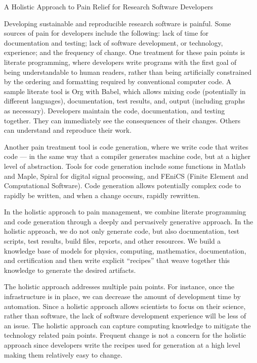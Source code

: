 A Holistic Approach to Pain Relief for Research Software Developers

Developing sustainable and reproducible research software is painful. Some
sources of pain for developers include the following: lack of time for
documentation and testing; lack of software development, or technology,
experience; and the frequency of change.  One treatment for these pain points is
literate programming, where developers write programs with the first goal of
being understandable to human readers, rather than being artificially
constrained by the ordering and formatting required by conventional computer
code.  A sample literate tool is Org with Babel, which allows mixing code
(potentially in different languages), documentation, test results, and, output
(including graphs as necessary).  Developers maintain the code, documentation,
and testing together. They can immediately see the consequences of their
changes.  Others can understand and reproduce their work.

Another pain treatment tool is code generation, where we write code that writes
code --- in the same way that a compiler generates machine code, but at a higher
level of abstraction. Tools for code generation include some functions in Matlab
and Maple, Spiral for digital signal processing, and FEniCS (Finite Element and
Computational Software).  Code generation allows potentially complex code to
rapidly be written, and when a change occurs, rapidly rewritten.  

In the holistic approach to pain management, we combine literate programming and
code generation through a deeply and pervasively generative approach.  In the
holistic approach, we do not only generate code, but also documentation, test
scripts, test results, build files, reports, and other resources. We build a
knowledge base of models for physics, computing, mathematics, documentation, and
certification and then write explicit ``recipes'' that weave together this
knowledge to generate the desired artifacts.

The holistic approach addresses multiple pain points.  For instance, once the
infrastructure is in place, we can decrease the amount of development time by
automation.  Since a holistic approach allows scientists to focus on their
science, rather than software, the lack of software development experience will
be less of an issue. The holistic approach can capture computing knowledge to
mitigate the technology related pain points.  Frequent change is not a concern
for the holistic approach since developers write the recipes used for generation
at a high level making them relatively easy to change.